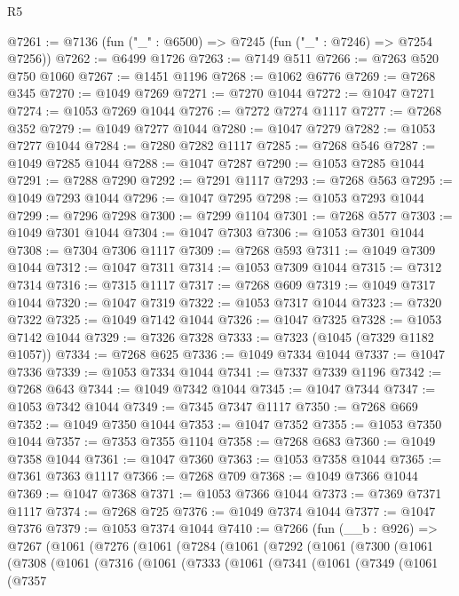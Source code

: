 \begin{lexlean}{R5}
\begin{coremodule}
@7261 := @7136 (fun ("_" : @6500) => @7245 (fun ("_" : @7246) => @7254 @7256))
@7262 := @6499 @1726
@7263 := @7149 @511
@7266 := @7263 @520 @750 @1060
@7267 := @1451 @1196
@7268 := @1062 @6776
@7269 := @7268 @345
@7270 := @1049 @7269
@7271 := @7270 @1044
@7272 := @1047 @7271
@7274 := @1053 @7269 @1044
@7276 := @7272 @7274 @1117
@7277 := @7268 @352
@7279 := @1049 @7277 @1044
@7280 := @1047 @7279
@7282 := @1053 @7277 @1044
@7284 := @7280 @7282 @1117
@7285 := @7268 @546
@7287 := @1049 @7285 @1044
@7288 := @1047 @7287
@7290 := @1053 @7285 @1044
@7291 := @7288 @7290
@7292 := @7291 @1117
@7293 := @7268 @563
@7295 := @1049 @7293 @1044
@7296 := @1047 @7295
@7298 := @1053 @7293 @1044
@7299 := @7296 @7298
@7300 := @7299 @1104
@7301 := @7268 @577
@7303 := @1049 @7301 @1044
@7304 := @1047 @7303
@7306 := @1053 @7301 @1044
@7308 := @7304 @7306 @1117
@7309 := @7268 @593
@7311 := @1049 @7309 @1044
@7312 := @1047 @7311
@7314 := @1053 @7309 @1044
@7315 := @7312 @7314
@7316 := @7315 @1117
@7317 := @7268 @609
@7319 := @1049 @7317 @1044
@7320 := @1047 @7319
@7322 := @1053 @7317 @1044
@7323 := @7320 @7322
@7325 := @1049 @7142 @1044
@7326 := @1047 @7325
@7328 := @1053 @7142 @1044
@7329 := @7326 @7328
@7333 := @7323 (@1045 (@7329 @1182 @1057))
@7334 := @7268 @625
@7336 := @1049 @7334 @1044
@7337 := @1047 @7336
@7339 := @1053 @7334 @1044
@7341 := @7337 @7339 @1196
@7342 := @7268 @643
@7344 := @1049 @7342 @1044
@7345 := @1047 @7344
@7347 := @1053 @7342 @1044
@7349 := @7345 @7347 @1117
@7350 := @7268 @669
@7352 := @1049 @7350 @1044
@7353 := @1047 @7352
@7355 := @1053 @7350 @1044
@7357 := @7353 @7355 @1104
@7358 := @7268 @683
@7360 := @1049 @7358 @1044
@7361 := @1047 @7360
@7363 := @1053 @7358 @1044
@7365 := @7361 @7363 @1117
@7366 := @7268 @709
@7368 := @1049 @7366 @1044
@7369 := @1047 @7368
@7371 := @1053 @7366 @1044
@7373 := @7369 @7371 @1117
@7374 := @7268 @725
@7376 := @1049 @7374 @1044
@7377 := @1047 @7376
@7379 := @1053 @7374 @1044
@7410 := @7266
    (fun (__b : @926) =>
    @7267
      (@1061
        (@7276
          (@1061
            (@7284
              (@1061
                (@7292
                  (@1061
                    (@7300
                      (@1061
                        (@7308
                          (@1061
                            (@7316
                              (@1061
                                (@7333
                                  (@1061
                                    (@7341
                                      (@1061
                                        (@7349
                                          (@1061
                                            (@7357

\end{coremodule}
\end{lexlean}
